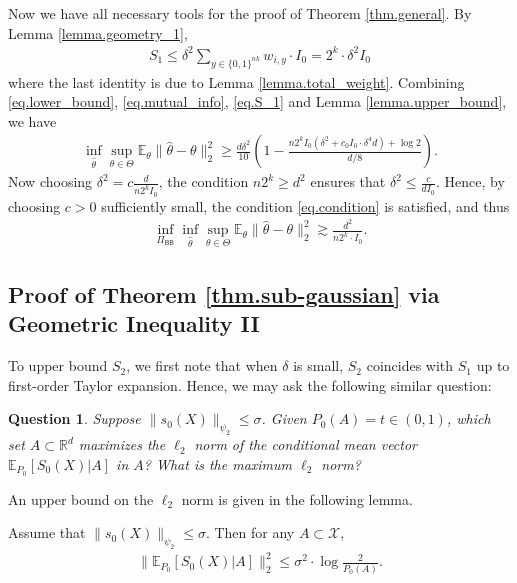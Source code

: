 \documentclass[final,12pt]{colt2018} %
\def \bE {\mathbb{E}}
\def \bR {\mathbb{R}}
\newcommand{\calX}{{\mathcal{X}}}
\newtheorem{question}{Question}
\begin{document}
Now we have all necessary tools for the proof of Theorem \ref{thm.general}. By Lemma \ref{lemma.geometry_1},
\begin{align}\label{eq.S_1}
S_1 \le \delta^2 \sum_{y\in \{0,1\}^{nk}} w_{i,y} \cdot I_0= 2^k\cdot \delta^2I_0
\end{align}
where the last identity is due to Lemma \ref{lemma.total_weight}. Combining \eqref{eq.lower_bound}, \eqref{eq.mutual_info}, \eqref{eq.S_1} and Lemma \ref{lemma.upper_bound}, we have
\begin{align*}
\inf_{\hat{\theta}}\sup_{\theta\in\Theta} \bE_\theta\|\hat{\theta}-\theta\|_2^2 \ge \frac{d\delta^2}{10}\left(1 - \frac{n2^kI_0(\delta^2 + c_0I_0\cdot\delta^4d)+\log 2}{d/8}\right).
\end{align*}
Now choosing $\delta^2=c\frac{d}{n2^kI_0}$, the condition $n2^k\ge d^2$ ensures that $\delta^2\le \frac{c}{dI_0}$. Hence, by choosing $c>0$ sufficiently small, the condition \eqref{eq.condition} is satisfied, and thus
\begin{align*}
\inf_{\Pi_{\mathsf{BB}}}\inf_{\hat{\theta}}\sup_{\theta\in\Theta} \bE_\theta\|\hat{\theta}-\theta\|_2^2 \gtrsim \frac{d^2}{n2^k\cdot I_0}.
\end{align*}

\subsection{Proof of Theorem \ref{thm.sub-gaussian} via Geometric Inequality II}
To upper bound $S_2$, we first note that when $\delta$ is small, $S_2$ coincides with $S_1$ up to first-order Taylor expansion. Hence, we may ask the following similar question: 
\begin{question}\label{question_2}
	Suppose $\|s_0(X)\|_{\psi_2}\le \sigma$. Given $P_0(A)=t\in (0,1)$, which set $A\subset \bR^d$ maximizes the $\ell_2$ norm of the conditional mean vector $\bE_{P_0}[S_0(X)|A]$ in $A$? What is the maximum $\ell_2$ norm?
\end{question}

An upper bound on the $\ell_2$ norm is given in the following lemma.
\begin{lemma}\label{lemma.geometry_2}
	Assume that $\|s_0(X)\|_{\psi_2}\le \sigma$. Then for any $A\subset \calX$, 
	\begin{align*}
	\|\bE_{P_0}[S_0(X)|A]\|_2^2  \le \sigma^2\cdot\log\frac{2}{P_0(A)}.
	\end{align*}
\end{lemma}
\end{document}
